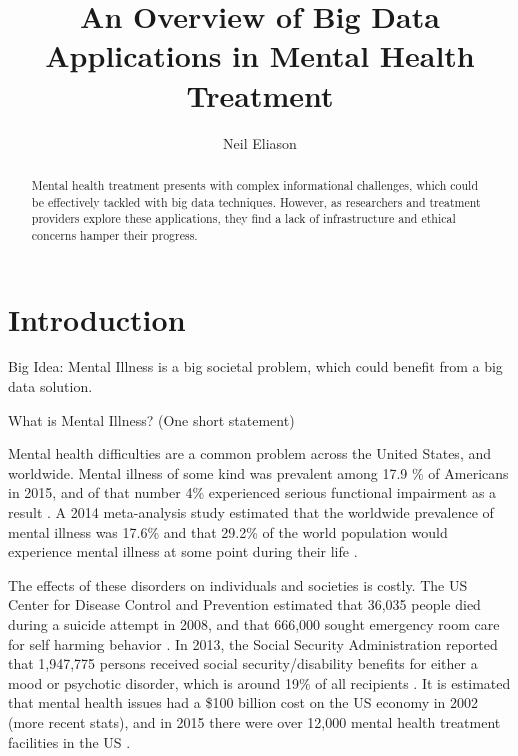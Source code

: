 \documentclass[sigconf]{acmart}
\begin{document}
\title{An Overview of Big Data Applications in Mental Health Treatment}


\author{Neil Eliason}


\renewcommand{\shortauthors}{Eliason}


\begin{abstract}
Mental health treatment presents with complex informational challenges, which could be effectively tackled with big data techniques. However, as researchers and treatment providers explore these applications, they find a lack of infrastructure and ethical concerns hamper their progress.

\end{abstract}



\maketitle

\section{Introduction}
Big Idea: Mental Illness is a big societal problem, which could benefit from a big data solution.

What is Mental Illness? (One short statement)

Mental health difficulties are a common problem across the United States, and worldwide. Mental illness of some kind was prevalent among 17.9 \% of Americans in 2015, and of that number 4\% experienced serious functional impairment as a result \cite{nihmStats}. A 2014 meta-analysis study estimated that the worldwide prevalence of mental illness was 17.6\% and that 29.2\% of the world population would experience mental illness at some point during their life \cite{worldprev}.  

The effects of these disorders on individuals and societies is costly. The US Center for Disease Control and Prevention estimated that 36,035 people died during a suicide attempt in 2008, and that 666,000 sought emergency room care for self harming behavior \cite{cdcsuicide}. In 2013, the Social Security Administration reported that 1,947,775 persons received social security/disability benefits for either a mood or psychotic disorder, which is around 19\% of all recipients \cite{ssarecipients}. 
It is estimated that mental health issues had a \$100 billion cost on the US economy in 2002 \cite{nihmStats} (more recent stats), and in 2015 there were over 12,000 mental health treatment facilities in the US \cite{N-MHSS2015}.
\end{document}
